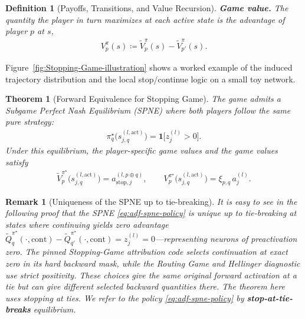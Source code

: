 \documentclass[twoside]{article}
\newcommand{\1}{\mathbf{1}}
\newtheorem{theorem}{Theorem}
\newtheorem{definition}{Definition}
\newtheorem{remark}{Remark}
\begin{document}
\begin{definition}[Payoffs, Transitions, and Value Recursion]
\textbf{Game value.} The quantity the player in turn maximizes at each active state is the
advantage of player $p$ at $s$,
\begin{align}\label{eq:adf-advantage}
    V_p^\pi(s) \coloneqq \tilde{V}_p^\pi(s) - \tilde{V}_{p'}^\pi(s).
\end{align}
\end{definition}

Figure~\ref{fig:Stopping-Game-illustration} shows a worked example of the induced trajectory
distribution and the local stop/continue logic on a small toy network.

\begin{theorem}[Forward Equivalence for Stopping Game]\label{thm:forward-stopping}
The game admits a Subgame Perfect Nash Equilibrium (SPNE) where both players follow the same pure
strategy:
\begin{align} \label{eq:adf-spne-policy}
    \pi_q^{\star}\bigl(s_{j,q}^{(l, \mathrm{act})}\bigr) = \1\bigl[z_j^{(l)} > 0\bigr].
\end{align}
Under this equilibrium, the player-specific game values and the game values satisfy
\begin{align}\label{eq:adf-spne-values}
    \tilde{V}_p^{\pi^\star}\bigl(s_{j,q}^{(l, \mathrm{act})}\bigr) = a_{\mathrm{stop},j}^{(l, p \oplus
    q)},
    \qquad
    V_p^{\pi^\star}\bigl(s_{j,q}^{(l, \mathrm{act})}\bigr) = \xi_{p,q}\, a_j^{(l)}.
\end{align}
\end{theorem}

\begin{remark}[Uniqueness of the SPNE up to tie-breaking] \label{rem:adf-spne-uniqueness}
It is easy to see in the following proof that the SPNE \eqref{eq:adf-spne-policy} is unique up to
tie-breaking at states where continuing yields zero advantage $\tilde
    Q_q^{\pi^\star}(\cdot,\mathrm{cont})-\tilde Q_{q'}^{\pi^\star}(\cdot,\mathrm{cont}) = z_j^{(l)} =
    0$---representing neurons of preactivation zero. The pinned Stopping-Game attribution code selects continuation at exact zero in its hard backward mask, while the Routing Game and Hellinger diagnostic use strict positivity. These choices give the same original forward activation at a tie but can give different selected backward quantities there. The theorem here uses stopping at ties. We refer to the policy
\eqref{eq:adf-spne-policy} by \textbf{stop-at-tie-breaks} equilibrium.
\end{remark}
\end{document}
